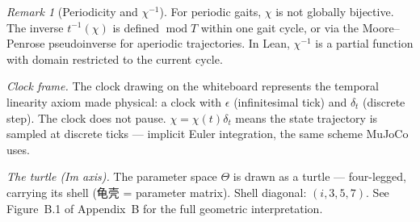\documentclass[11pt,a4paper]{article}
\theoremstyle{definition}
\theoremstyle{remark}
\newtheorem{remark}[theorem]{Remark}
\begin{document}
\begin{remark}[Periodicity and $\chi^{-1}$]
For periodic gaits, $\chi$ is not globally bijective. The inverse $t^{-1}(\chi)$ is defined $\operatorname{mod} T$ within one gait cycle, or via the Moore--Penrose pseudoinverse for aperiodic trajectories. In Lean, $\chi^{-1}$ is a partial function with domain restricted to the current cycle.
\end{remark}

\noindent\textit{Clock frame.} The clock drawing on the whiteboard represents the temporal linearity axiom made physical: a clock with $\epsilon$ (infinitesimal tick) and $\delta_t$ (discrete step). The clock does not pause. $\chi = \chi(t)\delta_t$ means the state trajectory is sampled at discrete ticks --- implicit Euler integration, the same scheme MuJoCo uses.

\noindent\textit{The turtle (Im axis).} The parameter space $\Theta$ is drawn as a turtle --- four-legged, carrying its shell (龟壳 = parameter matrix). Shell diagonal: $(i, 3, 5, 7)$. See Figure~B.1 of Appendix~B for the full geometric interpretation.
\end{document}
